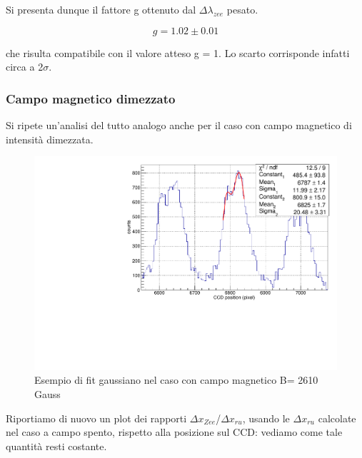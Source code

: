 \documentclass{article}
\begin{document}
	Si presenta dunque il fattore g ottenuto dal $\Delta\lambda_{zee}$ pesato.

	\[
		g = 1.02 \pm 0.01
	\]
	
	che risulta compatibile con il valore atteso g = 1.
	Lo scarto corrisponde infatti circa a 2$\sigma$.  

	 
	\subsubsection*{Campo magnetico dimezzato}

	Si ripete un'analisi del tutto analogo anche per il caso con campo magnetico di intensità dimezzata.
	
	
	\begin{center}
	\begin{figure}[H]
		\centering
		\includegraphics[scale=0.38, angle=0]{campomin/singolo.pdf}
		\caption{ Esempio di fit gaussiano nel caso con campo magnetico B= 2610 Gauss}
		\label{fig:singoloBonMin}
	\end{figure}
	\end{center}

	Riportiamo di nuovo un plot dei rapporti $\Delta x_{Zee}$/$\Delta x_{ru}$, usando le $\Delta x_{ru}$
	calcolate nel caso a campo spento, rispetto alla posizione sul CCD: vediamo come tale quantità resti 
	costante.
\end{document}
